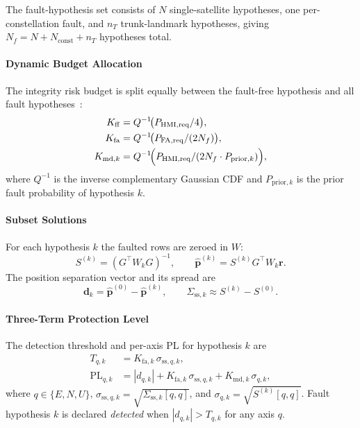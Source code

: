 \documentclass[journal]{IEEEtran}
\begin{document}
The fault-hypothesis set consists of $N$ single-satellite hypotheses,
one per-constellation fault, and $n_T$ trunk-landmark hypotheses,
giving $N_f = N + N_{\mathrm{const}} + n_T$ hypotheses total.

\paragraph{Dynamic Budget Allocation}
The integrity risk budget is split equally between the fault-free
hypothesis and all fault hypotheses~\cite{blanch2015}:
\begin{align}
  K_{\mathrm{ff}} &= Q^{-1}\!\bigl(P_{\mathrm{HMI,req}} / 4\bigr),
    \label{eq:K_ff}\\
  K_{\mathrm{fa}} &= Q^{-1}\!\bigl(P_{\mathrm{FA,req}} / (2 N_f)\bigr),
    \label{eq:K_fa}\\
  K_{\mathrm{md},k} &= Q^{-1}\!\Bigl(
      P_{\mathrm{HMI,req}} / (2 N_f \cdot P_{\mathrm{prior},k})
    \Bigr),
  \label{eq:K_md}
\end{align}
where $Q^{-1}$ is the inverse complementary Gaussian CDF and
$P_{\mathrm{prior},k}$ is the prior fault probability of hypothesis $k$.

\paragraph{Subset Solutions}
For each hypothesis $k$ the faulted rows are zeroed in $W$:
\begin{equation}
  S^{(k)} = (G^\top W_k G)^{-1}, \qquad
  \hat{\mathbf{p}}^{(k)} = S^{(k)} G^\top W_k \mathbf{r}.
  \label{eq:wls_subset}
\end{equation}
The position separation vector and its spread are
\begin{equation}
  \mathbf{d}_k = \hat{\mathbf{p}}^{(0)} - \hat{\mathbf{p}}^{(k)}, \qquad
  \Sigma_{\mathrm{ss},k} \approx S^{(k)} - S^{(0)}.
  \label{eq:separation}
\end{equation}

\paragraph{Three-Term Protection Level}
The detection threshold and per-axis PL for hypothesis $k$ are
\begin{align}
  T_{q,k} &= K_{\mathrm{fa},k}\,\sigma_{\mathrm{ss},q,k},
    \label{eq:T_qk}\\
  \mathrm{PL}_{q,k} &= |d_{q,k}|
    + K_{\mathrm{fa},k}\,\sigma_{\mathrm{ss},q,k}
    + K_{\mathrm{md},k}\,\sigma_{q,k},
  \label{eq:3term}
\end{align}
where $q \in \{E, N, U\}$, $\sigma_{\mathrm{ss},q,k} = \sqrt{\Sigma_{\mathrm{ss},k}[q,q]}$,
and $\sigma_{q,k} = \sqrt{S^{(k)}[q,q]}$.
Fault hypothesis $k$ is declared \emph{detected} when
$|d_{q,k}| > T_{q,k}$ for any axis $q$.
\end{document}
